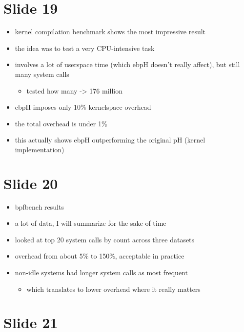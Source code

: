 \documentclass[
  12pt]{findlay}
\providecommand{\tightlist}{\setlength{\itemsep}{0pt}\setlength{\parskip}{0pt}}
\begin{document}
\hypertarget{slide-19}{%
\section{Slide 19}\label{slide-19}}

\begin{itemize}
\tightlist
\item
  kernel compilation benchmark shows the most impressive result
\item
  the idea was to test a very CPU-intensive task
\item
  involves a lot of userspace time (which ebpH doesn't really affect),
  but still many system calls

  \begin{itemize}
  \tightlist
  \item
    tested how many -\textgreater{} 176 million
  \end{itemize}
\item
  ebpH imposes only 10\% kernelspace overhead
\item
  the total overhead is under 1\%
\item
  this actually shows ebpH outperforming the original pH (kernel
  implementation)
\end{itemize}

\hypertarget{slide-20}{%
\section{Slide 20}\label{slide-20}}

\begin{itemize}
\tightlist
\item
  bpfbench results
\item
  a lot of data, I will summarize for the sake of time
\item
  looked at top 20 system calls by count across three datasets
\item
  overhead from about 5\% to 150\%, acceptable in practice
\item
  non-idle systems had longer system calls as most frequent

  \begin{itemize}
  \tightlist
  \item
    which translates to lower overhead where it really matters
  \end{itemize}
\end{itemize}

\hypertarget{slide-21}{%
\section{Slide 21}\label{slide-21}}
\end{document}
